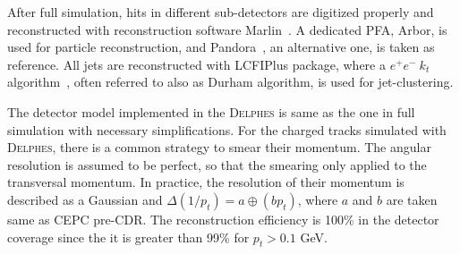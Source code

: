 \documentclass[a4paper,10pt,twoside]{cpc-hepnp}
\begin{document}

After full simulation,  hits in different sub-detectors are digitized properly
and reconstructed with reconstruction software  Marlin{~\cite{ref:marlin}}.
A dedicated PFA, Arbor\cite{ref:arbor},  is used for particle reconstruction, and Pandora{~\cite{ref:pandora}}, an alternative one,
is taken as reference. All jets are reconstructed with LCFIPlus package\cite{ref:lcfiplus},
where a $e^+e^-~k_t$ algorithm{~\cite{ref:eekt}},  often referred to also as {\sf Durham} algorithm,  is used for jet-clustering.

The detector model implemented in the {\textsc{Delphes}} is same as the one in full simulation with necessary simplifications.
For the charged tracks simulated with {\textsc{Delphes}}, there is a common strategy to smear their momentum.
The angular resolution is assumed to be perfect, so that the smearing only applied to the transversal momentum.
In practice, the resolution of their momentum is described as a Gaussian and  $\Delta(1/p_t)=a \oplus (b p_t) $,
where $a$ and $b$ are taken same as CEPC pre-CDR.
The reconstruction efficiency is 100\% in the detector coverage since the it is greater than 99\% for $p_t>0.1$ GeV.

\end{document}
